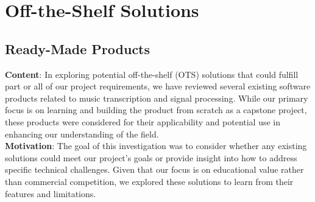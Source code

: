 \documentclass[12pt]{article}
\begin{document}
\section{Off-the-Shelf Solutions}
\subsection{Ready-Made Products}
\textbf{Content}: In exploring potential off-the-shelf (OTS) solutions that could fulfill part or all of our project requirements, we have reviewed several existing software products related to music transcription and signal processing. While our primary focus is on learning and building the product from scratch as a capstone project, these products were considered for their applicability and potential use in enhancing our understanding of the field.\\
\textbf{Motivation}: The goal of this investigation was to consider whether any existing solutions could meet our project’s goals or provide insight into how to address specific technical challenges. Given that our focus is on educational value rather than commercial competition, we explored these solutions to learn from their features and limitations.\\
\end{document}
